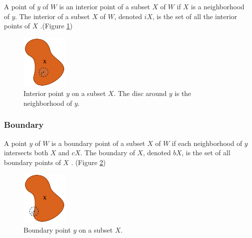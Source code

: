 \documentclass[a4paper,11pt,oneside]{article}
\begin{document}
\begin{definition}
	A point of $y$ of $W$ is an interior point of a subset $X$ of $W$ if $X$ is a neighborhood of $y$. The interior of a subset $X$ of $W$, denoted $iX$, is the set of all the interior points of $X$ \cite{Requicha1978MathematicalFO}.(Figure \ref{sec3.2:interior-neighborhood})
\end{definition}
    

\begin{figure}[ht]
	\begin{center}
		\includegraphics[width=0.2\textwidth]{section3/3.2/interior.png}
	\end{center}
	\caption{Interior point $y$ on a subset $X$. The disc around $y$ is the neighborhood of $y$.}
	\label{sec3.2:interior-neighborhood}
\end{figure}

\subsubsection{Boundary}
    
\begin{definition}
	A point $y$ of $W$ is a boundary point of a subset $X$ of $W$ if each neighborhood of $y$ intersects both $X$ and $cX$. The boundary of $X$, denoted $bX$, is the set of all boundary points of $X$ \cite{Requicha1978MathematicalFO}. (Figure \ref{sec3.2:boundary})
\end{definition}
    
\begin{figure}[ht]
	\begin{center}
		\includegraphics[width=0.2\textwidth]{section3/3.2/boundary.png}
	\end{center}
	\caption{Boundary point $y$ on a subset $X$.}
	\label{sec3.2:boundary}
\end{figure}
    
\end{document}
